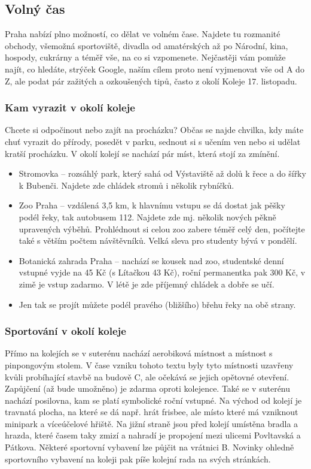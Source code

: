 \subsection{Volný čas}
Praha nabízí plno možností, co dělat ve volném čase. Najdete tu rozmanité obchody, všemožná sportoviště, divadla od amatérských až po Národní, kina, hospody, cukrárny a téměř vše, na co si vzpomenete. Nejčastěji vám pomůže najít, co hledáte, strýček Google, naším cílem proto není vyjmenovat vše od A do Z, ale podat pár zažitých a ozkoušených tipů, často z okolí Koleje 17. listopadu.

\subsubsection{Kam vyrazit v okolí koleje}
Chcete si odpočinout nebo zajít na procházku? Občas se najde chvilka, kdy máte chuť vyrazit do přírody, posedět v parku, sednout si s učením ven nebo si udělat kratší procházku. V okolí kolejí se nachází pár míst, která stojí za zmínění.

\begin{itemize}
    \item Stromovka – rozsáhlý park, který sahá od Výstaviště až dolů k řece a do šířky k Bubenči. Najdete zde chládek stromů i několik rybníčků.
    \item Zoo Praha – vzdálená 3,5 km, k hlavnímu vstupu se dá dostat jak pěšky podél řeky, tak autobusem 112. Najdete zde mj. několik nových pěkně upravených výběhů. Prohlédnout si celou zoo zabere téměř celý den, počítejte také s větším počtem návštěvníků. Velká sleva pro studenty bývá v pondělí.
    \item Botanická zahrada Praha – nachází se kousek nad zoo, studentské denní vstupné vyjde na 45 Kč (s Lítačkou 43 Kč), roční permanentka pak 300 Kč, v zimě je vstup zadarmo. V létě je zde příjemný chládek a dobře se učí.
    \item Jen tak se projít můžete podél pravého (bližšího) břehu řeky na obě strany.
\end{itemize}



\subsubsection{Sportování v okolí koleje}
Přímo na kolejích se v suterénu nachází aerobiková místnost a místnost s pinpongovým stolem. V čase vzniku tohoto textu byly tyto místnosti uzavřeny kvůli probíhající stavbě na budově C, ale očekává se jejich opětovné otevření. Zapůjčení (až bude umožněno) je zdarma oproti kolejence. Také se v suterénu nachází posilovna, kam se platí symbolické roční vstupné. Na východ od kolejí je travnatá plocha, na které se dá např. hrát frisbee, ale místo které má vzniknout minipark a víceúčelové hřiště. Na jižní straně jsou před kolejí umístěna bradla a hrazda, které časem taky zmizí a nahradí je propojení mezi ulicemi Povltavská a Pátkova. Některé sportovní vybavení lze půjčit na vrátnici B. Novinky ohledně sportovního vybavení na koleji pak píše kolejní rada na svých stránkách.

